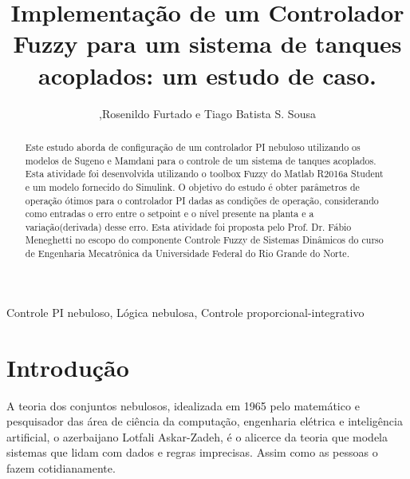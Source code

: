 \documentclass[conference]{IEEEtran}
\begin{document}
\title{Implementação de um Controlador Fuzzy para um sistema de tanques acoplados: um estudo de caso.}
\author{,Rosenildo Furtado e Tiago Batista S. Sousa
}

\maketitle


\begin{abstract}
Este estudo aborda de configuração de um controlador PI nebuloso utilizando os modelos de Sugeno e Mamdani para o controle de um sistema de tanques acoplados. Esta atividade foi desenvolvida utilizando o toolbox Fuzzy do Matlab R2016a Student e um modelo fornecido do Simulink. O objetivo do estudo é obter parâmetros de operação ótimos para o controlador PI dadas as condições de operação, considerando como entradas o erro entre o setpoint e o nível presente na planta e a variação(derivada) desse erro. Esta atividade foi proposta pelo Prof. Dr. Fábio Meneghetti no escopo do componente Controle Fuzzy de Sistemas Dinâmicos do curso de Engenharia Mecatrônica da Universidade Federal do Rio Grande do Norte.

\end{abstract}
\begin{IEEEkeywords}
Controle PI nebuloso, Lógica nebulosa, Controle proporcional-integrativo
\end{IEEEkeywords}
\IEEEpeerreviewmaketitle


\section{Introdução}

A teoria dos conjuntos nebulosos, idealizada em 1965 pelo matemático e pesquisador das área de ciência da computação, engenharia elétrica e inteligência artificial, o azerbaijano Lotfali Askar-Zadeh, é o alicerce da teoria que modela sistemas que lidam com dados e regras imprecisas. Assim como as pessoas o fazem cotidianamente.
\end{document}
